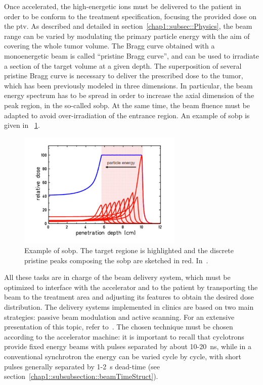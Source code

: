 Once accelerated, the high-energetic ions must be delivered to the patient in order to be conform to the treatment specification, focusing the provided dose on the \gls{ptv}. As described and detailed in section~\ref{chap1::subsec::Physics}, the beam range can be varied by modulating the primary particle energy with the aim of covering the whole tumor volume. The Bragg curve obtained with a monoenergetic beam is called \enquote{pristine Bragg curve}, and can be used to irradiate a section of the target volume at a given depth. The superposition of several pristine Bragg curve is necessary to deliver the prescribed dose to the tumor, which has been previously modeled in three dimensions. In particular, the beam energy spectrum has to be spread in order to increase the axial dimension of the peak region, in the so-called \gls{sobp}. At the same time, the beam fluence must be adapted to avoid over-irradiation of the entrance region. An example of \gls{sobp} is given in \figurename~\ref{chap1::fig::pristine_sobp}.

\begin{figure}[!htbp]
\centering
\includegraphics[width=0.7\textwidth]{03_GraphicFiles/chapter1_Introduction/pristine_sobp.pdf}
\caption{Example of \gls{sobp}. The target regione is highlighted and the discrete pristine peaks composing the \gls{sobp} are sketched in red. In~\cite{Durante2016}.}
\label{chap1::fig::pristine_sobp}
\end{figure} 

All these tasks are in charge of the beam delivery system, which must be optimized to interface with the accelerator and to the patient by transporting the beam to the treatment area and adjusting its features to obtain the desired dose distribution. 
The delivery systems implemented in clinics are based on two main strategies: passive beam modulation and active scanning. For an extensive presentation of this topic, refer to~\cite{Gottshalk2008}. The chosen technique must be chosen according to the accelerator machine: it is important to recall that cyclotrons provide fixed energy beams with pulses separated by about 10-20~ns, while in a conventional synchrotron the energy can be varied cycle by cycle, with short pulses generally separated by 1-2~s dead-time (see section~\ref{chap1::subsubsection::beamTimeStruct}). 

